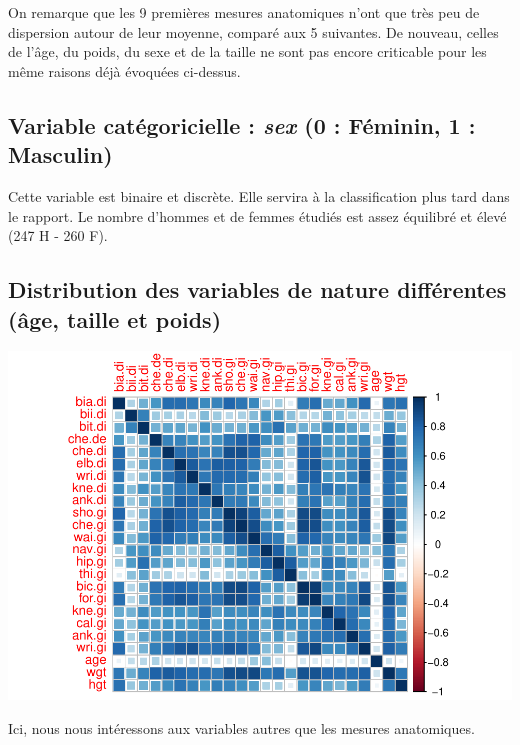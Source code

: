 \documentclass[
]{article}
\begin{document}
On remarque que les 9 premières mesures anatomiques n'ont que très peu
de dispersion autour de leur moyenne, comparé aux 5 suivantes. De
nouveau, celles de l'âge, du poids, du sexe et de la taille ne sont pas
encore criticable pour les même raisons déjà évoquées ci-dessus.

\hypertarget{variable-catuxe9goricielle-sex-0-fuxe9minin-1-masculin}{%
\subsection{\texorpdfstring{Variable catégoricielle : \emph{sex} (0 :
Féminin, 1 :
Masculin)}{Variable catégoricielle : sex (0 : Féminin, 1 : Masculin)}}\label{variable-catuxe9goricielle-sex-0-fuxe9minin-1-masculin}}

Cette variable est binaire et discrète. Elle servira à la classification
plus tard dans le rapport. Le nombre d'hommes et de femmes étudiés est
assez équilibré et élevé (247 H - 260 F).

\hypertarget{distribution-des-variables-de-nature-diffuxe9rentes-uxe2ge-taille-et-poids}{%
\subsection{Distribution des variables de nature différentes (âge,
taille et
poids)}\label{distribution-des-variables-de-nature-diffuxe9rentes-uxe2ge-taille-et-poids}}

\begin{center}\includegraphics{Template_files/figure-latex/unnamed-chunk-5-1} \end{center}

Ici, nous nous intéressons aux variables autres que les mesures
anatomiques.
\end{document}
